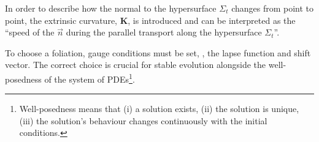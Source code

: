 
In order to describe how the normal to the hypersurface $\Sigma_t$ changes 
from point to point, the extrinsic curvature, $\boldsymbol{K}$, is introduced 
%
and can be interpreted as the ``speed of the $\vec{n}$ during the parallel 
transport along the hypersurface $\Sigma_t$''. 



To choose a foliation, gauge conditions must be set, \ie, the 
lapse function and shift vector. 
The correct choice is crucial for stable evolution 
\citep{Alcubierre:2002kk}
alongside the well-posedness of the system of \acp{PDE}\footnote{
    Well-posedness means that (i) a solution exists, (ii) the solution is unique,
    (iii) the solution's behaviour changes continuously with the initial conditions.
}.
%

